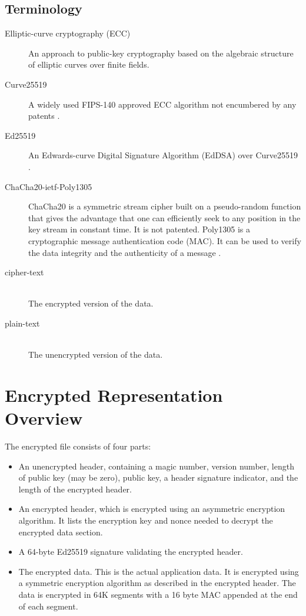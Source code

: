 \documentclass[10pt]{article}
\begin{document}
\subsection{Terminology}
\begin{description}
\item[Elliptic-curve cryptography (ECC)]
An approach to public-key cryptography based on the algebraic structure of elliptic curves over finite fields.
\item[Curve25519]
A widely used FIPS-140 approved ECC algorithm not encumbered by any patents \cite{RFC7748}. 
\item[Ed25519]
An Edwards-curve Digital Signature Algorithm (EdDSA) over Curve25519 \cite{RFC8032}.
\item[ChaCha20-ietf-Poly1305]
ChaCha20 is a symmetric stream cipher built on a pseudo-random function that gives the advantage that one can 
efficiently seek to any position in the key stream in constant time.
It is not patented.
Poly1305 is a cryptographic message authentication code (MAC).
It can be used to verify the data integrity and the authenticity of a message \cite{RFC8439}.

\item[cipher-text]~\\
The encrypted version of the data.

\item[plain-text]~\\
The unencrypted version of the data.
 
\end{description}

\section{Encrypted Representation Overview}
The encrypted file consists of four parts:

\begin{itemize}
\item An unencrypted header, containing a magic number, version number, length of public key 
(may be zero), public key, a header signature indicator, and the length of the encrypted header.

\item An encrypted header, which is encrypted using an asymmetric encryption algorithm.
It lists the encryption key and nonce needed to decrypt the encrypted data section.

\item A 64-byte Ed25519 signature validating the encrypted header.

\item The encrypted data.
This is the actual application data.
It is encrypted using a symmetric encryption algorithm as described in the encrypted header.
The data is encrypted in 64K segments with a 16 byte MAC appended at the end of each segment.
\end{itemize}
\end{document}
